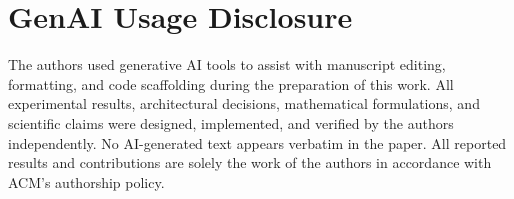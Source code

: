 \documentclass[sigconf]{acmart}
\begin{document}


\section*{GenAI Usage Disclosure}
The authors used generative AI tools to assist with
manuscript editing, formatting, and code scaffolding
during the preparation of this work. All experimental
results, architectural decisions, mathematical
formulations, and scientific claims were designed,
implemented, and verified by the authors independently.
No AI-generated text appears verbatim in the paper.
All reported results and contributions are solely
the work of the authors in accordance with ACM's
authorship policy.
\end{document}
